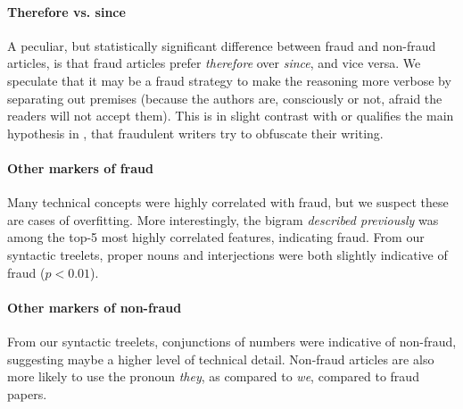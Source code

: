 \documentclass[11pt,letterpaper]{article}
\begin{document}
\paragraph{Therefore vs. since} A peculiar, but statistically significant difference between fraud and non-fraud articles, is that fraud articles prefer {\em therefore} over {\em since}, and vice versa. We speculate that it may be a fraud strategy to make the reasoning more verbose by separating out premises  (because the authors are, consciously or not, afraid the readers will not accept them). This is in slight contrast with or qualifies the main hypothesis in , that fraudulent writers try to obfuscate their writing.

\paragraph{Other markers of fraud} Many technical concepts were highly correlated with fraud, but we suspect these are cases of overfitting. More interestingly, the bigram {\em described previously} was among the top-5 most highly correlated features, indicating fraud. From our syntactic treelets, proper nouns and interjections were both slightly indicative of fraud ($p<0.01$). 

\paragraph{Other markers of non-fraud} From our syntactic treelets, conjunctions of numbers were indicative of non-fraud, suggesting maybe a higher level of technical detail. Non-fraud articles are also more likely to use the pronoun {\em they}, as compared to {\em we}, compared to fraud papers.
\end{document}
